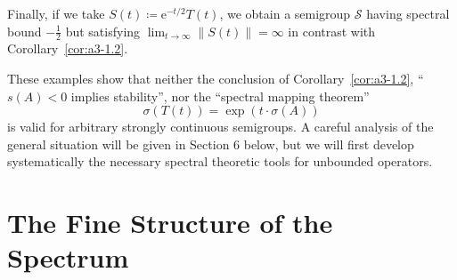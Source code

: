 Finally, if we take $S(t) \coloneqq \mathrm{e}^{-t/2}T(t)$, we obtain a semigroup $\mathcal{S}$ 
having spectral bound $-\frac{1}{2}$ but satisfying $\lim_{t \to \infty} \|S(t)\| = \infty$ in contrast with Corollary~\ref{cor:a3-1.2}.

These examples show that neither the conclusion of Corollary~\ref{cor:a3-1.2}, \ie \enquote{$s(A) < 0$ implies stability}, nor the \enquote{spectral mapping theorem}
\[
    \sigma(T(t)) = \exp(t\cdot\sigma(A))
\]
is valid for arbitrary strongly continuous semigroups.
A careful analysis of the general situation will be given in Section 6 below, but we will first develop systematically the necessary spectral theoretic tools for unbounded operators.
\section{The Fine Structure of the Spectrum}\label{sec:a3-2}


